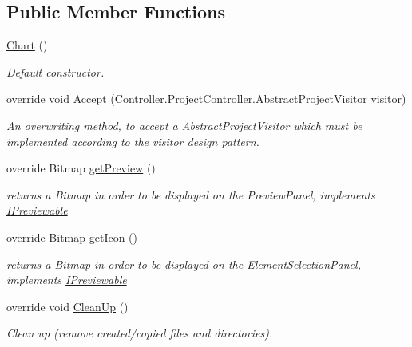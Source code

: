 \subsection*{Public Member Functions}
\begin{DoxyCompactItemize}
\item 
\hyperlink{class_a_rdev_kit_1_1_model_1_1_project_1_1_chart_adc15fc2ed54bf85d32868514e94afb28}{Chart} ()
\begin{DoxyCompactList}\small\item\em Default constructor. \end{DoxyCompactList}\item 
override void \hyperlink{class_a_rdev_kit_1_1_model_1_1_project_1_1_chart_a45ba9adb6f6219d3fb8dc6e0edd2700a}{Accept} (\hyperlink{class_a_rdev_kit_1_1_controller_1_1_project_controller_1_1_abstract_project_visitor}{Controller.\-Project\-Controller.\-Abstract\-Project\-Visitor} visitor)
\begin{DoxyCompactList}\small\item\em An overwriting method, to accept a Abstract\-Project\-Visitor which must be implemented according to the visitor design pattern. \end{DoxyCompactList}\item 
override Bitmap \hyperlink{class_a_rdev_kit_1_1_model_1_1_project_1_1_chart_aab1b49aedaba3798818abd14c69918e8}{get\-Preview} ()
\begin{DoxyCompactList}\small\item\em returns a Bitmap in order to be displayed on the Preview\-Panel, implements \hyperlink{interface_a_rdev_kit_1_1_model_1_1_project_1_1_i_previewable}{I\-Previewable} \end{DoxyCompactList}\item 
override Bitmap \hyperlink{class_a_rdev_kit_1_1_model_1_1_project_1_1_chart_a5a3555ace98e2f5c9f4daaa73f94cd96}{get\-Icon} ()
\begin{DoxyCompactList}\small\item\em returns a Bitmap in order to be displayed on the Element\-Selection\-Panel, implements \hyperlink{interface_a_rdev_kit_1_1_model_1_1_project_1_1_i_previewable}{I\-Previewable} \end{DoxyCompactList}\item 
override void \hyperlink{class_a_rdev_kit_1_1_model_1_1_project_1_1_chart_a5cccd28644f1f358d551028759a3fed0}{Clean\-Up} ()
\begin{DoxyCompactList}\small\item\em Clean up (remove created/copied files and directories). \end{DoxyCompactList}\item 

\end{DoxyCompactItemize}
